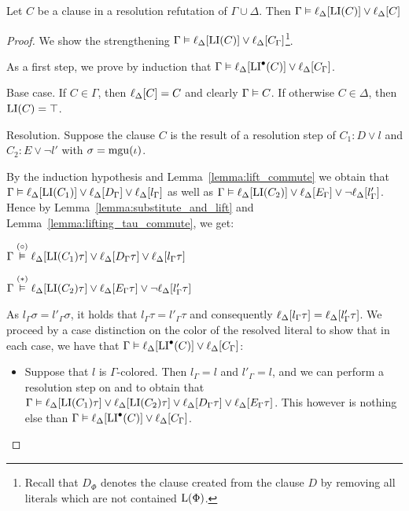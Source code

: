 \begin{lemma}
	\label{lemma:gamma_entails_delta_lifted_invariant}
	Let $C$ be a clause in a resolution refutation of $\Gamma \cup \Delta$.
	Then
	$\Gamma \vDash \ell_{\Delta}[ \operatorname{LI}(C) ] \lor \ell_{\Delta}[C] $
\end{lemma}
\begin{proof}
	We show the strengthening
	$\Gamma \vDash \ell_{\Delta}[ \operatorname{LI}(C) ] \lor \ell_{\Delta}[C_\Gamma]$\footnote{Recall that $D_\Phi$ denotes the clause created from the clause $D$ by removing all literals which are not contained $\operatorname{L}(\Phi)$.}.

	As a first step, 
	we prove by induction that
	$\Gamma \vDash \ell_{\Delta}[ \operatorname{LI}^\bullet(C) ] \lor \ell_{\Delta}[C_\Gamma]$.


	\begin{description}
		\item{} Base case.
			If $C\in \Gamma$, then $\ell_{\Delta}[C] = C$ and clearly $\Gamma \vDash C$.
			If otherwise $C \in \Delta$, then $\operatorname{LI}(C) = \top$.

		\item{} Resolution.
			Suppose the clause $C$ is the result of a resolution step \inference{} of $C_1: D \lor l$ and $C_2: E \lor \lnot l'$ with $\sigma = \operatorname{mgu}(\iota)$.

			By the induction hypothesis and Lemma~\ref{lemma:lift_commute} we obtain that
			$\Gamma \vDash \ell_{\Delta}[\operatorname{LI}(C_1)] \lor \ell_{\Delta}[D_\Gamma] \lor \ell_{\Delta}[l_\Gamma]$
			as well as 
			$\Gamma \vDash \ell_{\Delta}[\operatorname{LI}(C_2)] \lor \ell_{\Delta}[E_\Gamma] \lor \lnot \ell_{\Delta}[l'_\Gamma]$.
			Hence by Lemma~\ref{lemma:substitute_and_lift} and Lemma~\ref{lemma:lifting_tau_commute}, we get:

			$\Gamma \stackrel{(\circ)}{\vDash} \ell_{\Delta}[\operatorname{LI}(C_1)\tau] \lor \ell_{\Delta}[D_\Gamma\tau] \lor \ell_{\Delta}[l_\Gamma\tau]$

			$\Gamma \stackrel{(*)}{\vDash} \ell_{\Delta}[\operatorname{LI}(C_2)\tau] \lor \ell_{\Delta}[E_\Gamma\tau] \lor \lnot \ell_{\Delta}[l'_\Gamma\tau]$

			As $l_\Gamma\sigma = l'_\Gamma\sigma$,
			it holds that $l_\Gamma\tau = l'_\Gamma\tau$ and consequently 
			$\ell_{\Delta}[l_\Gamma\tau] = \ell_{\Delta}[l'_\Gamma\tau]$.
			We proceed by a case distinction on the color of the resolved literal to show that in each case, we have that
			$\Gamma \vDash \ell_{\Delta}[\operatorname{LI}^\bullet(C)] \lor \ell_{\Delta}[C_\Gamma]$:
			\begin{itemize}
				\item Suppose that $l$ is $\Gamma$-colored.
					Then $l_\Gamma = l$ and $l'_\Gamma = l$, and we can perform a resolution step on \markA{} and \markB{} to obtain that
					$\Gamma \vDash
					\ell_{\Delta}[\operatorname{LI}(C_1)\tau] \lor
					\ell_{\Delta}[\operatorname{LI}(C_2)\tau] \lor 
					\ell_{\Delta}[D_\Gamma\tau]  \lor
					\ell_{\Delta}[E_\Gamma\tau]$.
					This however is nothing else than $\Gamma \vDash \ell_{\Delta}[\operatorname{LI}^\bullet(C)] \lor \ell_{\Delta}[C_\Gamma]$.


\end{itemize}
\end{description}
\end{proof}
